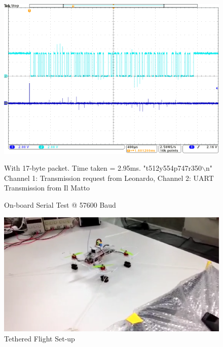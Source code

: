 \documentclass[a4paper,11pt]{article}
\begin{document}
\begin{figure}[!ht]
    \includegraphics[width=\textwidth]{57600_baud_comms.png}
    \caption{On-board Serial Test @ 57600 Baud}
    \medskip
    \small
    \centering
    With 17-byte packet. Time taken = 2.95ms. "t512y554p747r350$\backslash$n" \\Channel 1: Transmission request from Leonardo, Channel 2: UART Transmission from Il Matto
    \label{fig:57600 Baud}
\end{figure}
\newpage
\begin{figure}[!ht]
    \includegraphics[width=\textwidth]{tethered.png}
    \caption{Tethered Flight Set-up}
    \label{fig:Tethered}
\end{figure}
\end{document}
